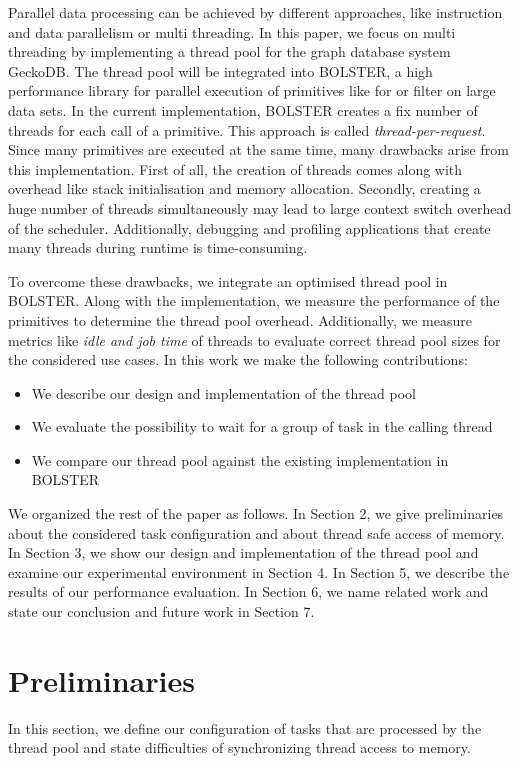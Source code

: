 \documentclass[conference]{IEEEtran}
\begin{document}
Parallel data processing can be achieved by different approaches, like instruction and data parallelism or multi threading. In this paper, we focus on multi threading by implementing a thread pool for the graph database system GeckoDB. The thread pool will be integrated into BOLSTER, a high performance library for parallel execution of primitives like for or filter on large data sets. In the current implementation, BOLSTER creates a fix number of threads for each call of a primitive. This approach is called \emph{thread-per-request}. Since many primitives are executed at the same time, many drawbacks arise from this implementation. 
First of all, the creation of threads comes along with overhead like stack initialisation and memory allocation. Secondly, creating a huge number of threads simultaneously may lead to large context switch overhead of the scheduler. Additionally, debugging and profiling applications that create many threads during runtime is 	time-consuming.

To overcome these drawbacks, we integrate an optimised thread pool in BOLSTER. Along with the implementation, we measure the performance of the primitives to determine the thread pool overhead. Additionally, we measure metrics like \emph{idle and job time} of threads to evaluate correct thread pool sizes for the considered use cases.  In this work we make the following contributions:
\begin{itemize}
	\item We describe our design and implementation of the thread pool 
	\item We evaluate the possibility to wait for a group of task in the calling thread
	\item We compare our thread pool against the existing implementation in BOLSTER
\end{itemize}
We organized the rest of the paper as follows. In Section 2, we give preliminaries about the considered task configuration and about thread safe access of memory. In Section 3, we show our design and implementation of the thread pool and examine our experimental environment in Section 4. In Section 5, we describe the results of our performance evaluation. In Section 6, we name related work and state our conclusion and future work in Section 7.

\section{Preliminaries}
In this section, we define our configuration of tasks that are processed by the thread pool and state difficulties of synchronizing thread access to memory.
\end{document}
